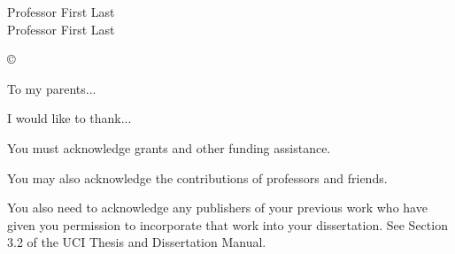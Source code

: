 \renewcommand{\appendix}
{
	\par
	\setcounter{section}{0}
	\gdef\thechapter{\@Alph\c@section}
	\gdef\thesection{\@Alph\c@section}
	\chapter*{Appendices}
	\addcontentsline{toc}{chapter}{Appendices}
}





\thesistitle{
       \Large\bf
       \titleRef
}





\othercommitteemembers
{
	Professor First Last\\
	Professor First Last
}


\copyrightdeclaration
{
	{\copyright} {\Degreeyear} \Authorname
}


\dedications
{
	To my parents...
}

\acknowledgments
{
	I would like to thank...

	You must acknowledge grants and other funding assistance. 

	You may also acknowledge the contributions of professors and friends. 
	
	You also need to acknowledge any publishers of your previous work who have given you permission to incorporate that work into your dissertation. See Section 3.2 of the UCI Thesis and Dissertation Manual.
}

